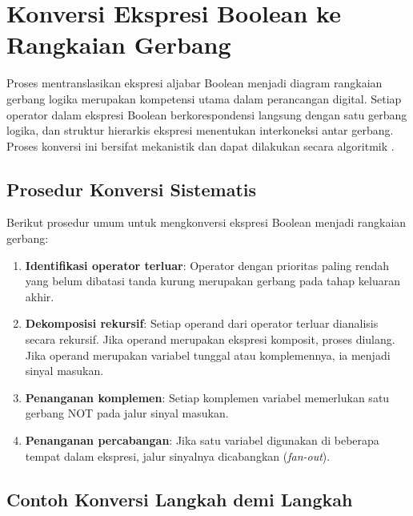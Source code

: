 \section{Konversi Ekspresi Boolean ke Rangkaian Gerbang}

Proses mentranslasikan ekspresi aljabar Boolean menjadi diagram rangkaian gerbang logika merupakan kompetensi utama dalam perancangan digital. Setiap operator dalam ekspresi Boolean berkorespondensi langsung dengan satu gerbang logika, dan struktur hierarkis ekspresi menentukan interkoneksi antar gerbang. Proses konversi ini bersifat mekanistik dan dapat dilakukan secara algoritmik \cite{rosen2019}.

\subsection{Prosedur Konversi Sistematis}

Berikut prosedur umum untuk mengkonversi ekspresi Boolean menjadi rangkaian gerbang:

\begin{enumerate}
  \item \textbf{Identifikasi operator terluar}: Operator dengan prioritas paling rendah yang belum dibatasi tanda kurung merupakan gerbang pada tahap keluaran akhir.
  \item \textbf{Dekomposisi rekursif}: Setiap operand dari operator terluar dianalisis secara rekursif. Jika operand merupakan ekspresi komposit, proses diulang. Jika operand merupakan variabel tunggal atau komplemennya, ia menjadi sinyal masukan.
  \item \textbf{Penanganan komplemen}: Setiap komplemen variabel memerlukan satu gerbang NOT pada jalur sinyal masukan.
  \item \textbf{Penanganan percabangan}: Jika satu variabel digunakan di beberapa tempat dalam ekspresi, jalur sinyalnya dicabangkan (\textit{fan-out}).
\end{enumerate}

\subsection{Contoh Konversi Langkah demi Langkah}


